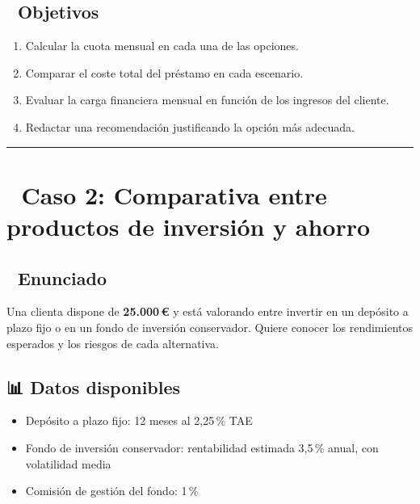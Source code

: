 \documentclass[
  letterpaper,
  DIV=11,
  numbers=noendperiod]{scrreprt}
\providecommand{\tightlist}{%
  \setlength{\itemsep}{0pt}\setlength{\parskip}{0pt}}\usepackage{longtable,booktabs,array}
\begin{document}
\begin{tcolorbox}
\subsection{🎯 Objetivos}\label{objetivos-1}

\begin{enumerate}
\def\labelenumi{\arabic{enumi}.}
\tightlist
\item
  Calcular la cuota mensual en cada una de las opciones.
\item
  Comparar el coste total del préstamo en cada escenario.
\item
  Evaluar la carga financiera mensual en función de los ingresos del
  cliente.
\item
  Redactar una recomendación justificando la opción más adecuada.
\end{enumerate}

\begin{center}\rule{0.5\linewidth}{0.5pt}\end{center}

\section{📁 Caso 2: Comparativa entre productos de inversión y
ahorro}\label{caso-2-comparativa-entre-productos-de-inversiuxf3n-y-ahorro}

\subsection{🧾 Enunciado}\label{enunciado-1}

Una clienta dispone de \textbf{25.000\,€} y está valorando entre
invertir en un depósito a plazo fijo o en un fondo de inversión
conservador. Quiere conocer los rendimientos esperados y los riesgos de
cada alternativa.

\subsection{📊 Datos disponibles}\label{datos-disponibles-1}

\begin{itemize}
\tightlist
\item
  Depósito a plazo fijo: 12 meses al 2,25\,\% TAE
\item
  Fondo de inversión conservador: rentabilidad estimada 3,5\,\% anual,
  con volatilidad media
\item
  Comisión de gestión del fondo: 1\,\%
\end{itemize}


\end{tcolorbox}
\end{document}
